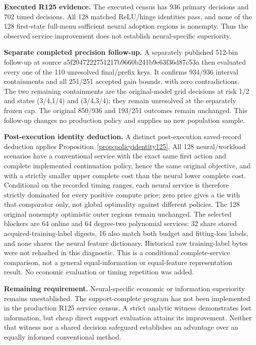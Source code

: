 \noindent\textbf{Executed R125 evidence.} The executed census has 936 primary decisions and 702 timed decisions. All 128 matched ReLU/hinge identities pass, and none of the 128 first-state full-menu sufficient neural adoption regions is nonempty. Thus the observed service improvement does not establish neural-specific superiority.

\noindent\textbf{Separate completed precision follow-up.} A separately published 512-bin follow-up at source a5f2047222751217b9660b241b9e63f36d87c53a then evaluated every one of the 110 unresolved final/prefix keys. It confirms 934/936 interval containments and all 251/251 accepted gain bounds, with zero contradictions. The two remaining containments are the original-model grid decisions at risk 1/2 and states (3/4,1/4) and (3/4,3/4); they remain unresolved at the separately frozen cap. The original 850/936 and 193/251 outcomes remain unchanged. This follow-up changes no production policy and supplies no new population sample.

\noindent\textbf{Post-execution identity deduction.} A distinct post-execution saved-record deduction applies Proposition~\ref{prop:policyidentity125}. All 128 neural/workload scenarios have a conventional service with the exact same first action and complete implemented continuation policy, hence the same original objective, and with a strictly smaller upper complete cost than the neural lower complete cost. Conditional on the recorded timing ranges, each neural service is therefore strictly dominated for every positive compute price; zero price gives a tie with that comparator only, not global optimality against different policies. The 128 original nonempty optimistic outer regions remain unchanged. The selected blockers are 64 online and 64 degree-two polynomial services: 32 share stored acquired-training-label digests, 16 also match both budget and fitting-loss labels, and none shares the neural feature dictionary. Historical raw training-label bytes were not rehashed in this diagnostic. This is a conditional complete-service comparison, not a general equal-information or equal-feature representation result. No economic evaluation or timing repetition was added.

\noindent\textbf{Remaining requirement.} Neural-specific economic or information superiority remains unestablished. The support-complete program has not been implemented in the production R125 service census. A strict analytic witness demonstrates lost information, but cheap direct support evaluation attains its improvement. Neither that witness nor a shared decision safeguard establishes an advantage over an equally informed conventional method.

